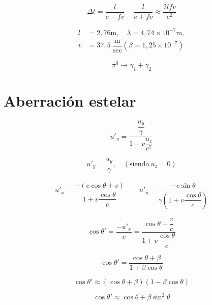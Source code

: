 \documentclass[../main]{subfiles}
\begin{document}
\begin{equation*}
    \Delta t=\dfrac{l}{c-fv}-\dfrac{l}{c+fv}\approx \dfrac{2lfv}{c^2}
\end{equation*}

\begin{align*}
    l&=2,76\text{m}, \quad \lambda=4,74\times 10^{-7} \text{m}, \\
    v&=37,5\ \dfrac{\text{m}}{\text{sec}} (\beta =1,25 \times 10^{-7})
\end{align*}

\begin{equation*}
    \pi^{0} \rightarrow \gamma_1+\gamma_2
\end{equation*}

\section{Aberración estelar}

\begin{equation*}
    u'_y=\dfrac{\dfrac{u_y}{\gamma}}{1-v\dfrac{u_z}{c^2}}
\end{equation*}

\begin{equation*}
    u'_y=\dfrac{u_y}{\gamma}, \quad (\text{siendo} \ u_z=0)
\end{equation*}

\begin{align*}
    u'_x=\dfrac{-(c\cos{\theta}+v)}{1+v\dfrac{\cos{\theta}}{c}} \qquad u'_y=\dfrac{-c\sin{\theta}}{\gamma(1+v\dfrac{\cos{\theta}}{c})}
\end{align*}

\begin{equation*}
    \cos{\theta'}=\dfrac{-u'_x}{c}=\dfrac{\cos{\theta}+\dfrac{v}{c}}{1+v\dfrac{\cos{\theta}}{c}}
\end{equation*}

\begin{equation*}
    \cos{\theta'}=\dfrac{\cos{\theta}+\beta}{1+\beta \cos{\theta}}
\end{equation*}

\begin{equation*}
    \cos{\theta'}\approx (\cos{\theta}+\beta)(1-\beta \cos{\theta})
\end{equation*}

\begin{equation*}
    \cos{\theta'}\approx \cos{\theta}+\beta \sin^2{\theta}
\end{equation*}
\end{document}
